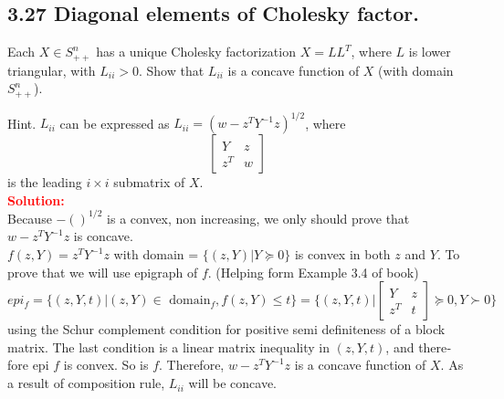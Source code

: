 \begin{latin}

\section{3.27 Diagonal elements of Cholesky factor.}
Each $ X \in S^{n}_{++} $ has a unique Cholesky factorization $ X = LL^{T} $, where $ L $ is lower triangular, with $ L_{ii} > 0 $. Show that $ L_{ii} $ is a concave function of $ X $ (with domain $ S^{n}_{++} $).

Hint. $ L_{ii} $ can be expressed as $ L_{ii} = (w - z^{T} Y^{-1} z)^{1/2}$, where
\begin{equation*}
	\begin{bmatrix}
		Y & z \\
		z^{T} & w 
	\end{bmatrix}
\end{equation*}
is the leading $ i \times i $ submatrix of $ X $.
\\
\textcolor{red}{\textbf{Solution:}}
\\
Because $ -()^{1/2} $ is a convex, non increasing, we only should prove that $ w - z^{T} Y^{-1} z $ is concave.
\\
$ f(z,Y) = z^{T} Y^{-1} z $ with domain = $ \{ (z,Y) | Y \succeq 0\} $ is convex in both $ z $ and $ Y $. To prove that we will use epigraph of $ f $. (Helping form Example 3.4 of book)
\begin{equation*}
	epi_{f} = \{(z,Y,t) | (z,Y) \in \text{ domain}_{f} ,f(z,Y) \leq t\} = \bigg\{ (z,Y,t) | \begin{bmatrix}
		Y & z \\
		z^{T} & t
	\end{bmatrix} \succeq 0, Y \succ 0 \bigg\}
\end{equation*}
using the Schur complement condition for positive semi definiteness of a block matrix. The last condition is a linear matrix inequality in $ (z, Y, t) $, and therefore epi $ f $ is convex. So is $ f $. Therefore, $ w - z^{T} Y^{-1} z $ is a concave function of $ X $. As a result of composition rule, $ L_{ii} $ will be concave.
\end{latin}